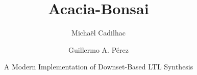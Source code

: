 \documentclass[aspectratio=169]{beamer}
\title{Acacia-Bonsai}
\date{A Modern Implementation of Downset-Based LTL Synthesis}
\author{Micha\"el Cadilhac \and Guillermo A. P\'erez}
\begin{document}
\begin{frame}
	\titlepage
\end{frame}

\end{document}
